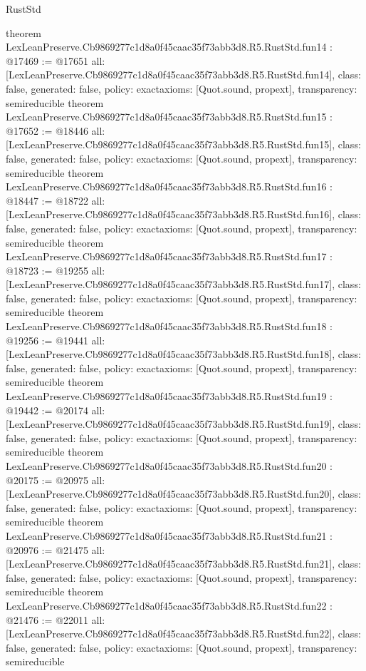 \begin{lexlean}{RustStd}
\begin{coremodule}
{}
theorem LexLeanPreserve.Cb9869277c1d8a0f45caac35f73abb3d8.R5.RustStd.fun14 : @17469 := @17651 {
  all: [LexLeanPreserve.Cb9869277c1d8a0f45caac35f73abb3d8.R5.RustStd.fun14],
  class: false,
  generated: false,
  policy: exact{axioms: [Quot.sound, propext]},
  transparency: semireducible
}
theorem LexLeanPreserve.Cb9869277c1d8a0f45caac35f73abb3d8.R5.RustStd.fun15 : @17652 := @18446 {
  all: [LexLeanPreserve.Cb9869277c1d8a0f45caac35f73abb3d8.R5.RustStd.fun15],
  class: false,
  generated: false,
  policy: exact{axioms: [Quot.sound, propext]},
  transparency: semireducible
}
theorem LexLeanPreserve.Cb9869277c1d8a0f45caac35f73abb3d8.R5.RustStd.fun16 : @18447 := @18722 {
  all: [LexLeanPreserve.Cb9869277c1d8a0f45caac35f73abb3d8.R5.RustStd.fun16],
  class: false,
  generated: false,
  policy: exact{axioms: [Quot.sound, propext]},
  transparency: semireducible
}
theorem LexLeanPreserve.Cb9869277c1d8a0f45caac35f73abb3d8.R5.RustStd.fun17 : @18723 := @19255 {
  all: [LexLeanPreserve.Cb9869277c1d8a0f45caac35f73abb3d8.R5.RustStd.fun17],
  class: false,
  generated: false,
  policy: exact{axioms: [Quot.sound, propext]},
  transparency: semireducible
}
theorem LexLeanPreserve.Cb9869277c1d8a0f45caac35f73abb3d8.R5.RustStd.fun18 : @19256 := @19441 {
  all: [LexLeanPreserve.Cb9869277c1d8a0f45caac35f73abb3d8.R5.RustStd.fun18],
  class: false,
  generated: false,
  policy: exact{axioms: [Quot.sound, propext]},
  transparency: semireducible
}
theorem LexLeanPreserve.Cb9869277c1d8a0f45caac35f73abb3d8.R5.RustStd.fun19 : @19442 := @20174 {
  all: [LexLeanPreserve.Cb9869277c1d8a0f45caac35f73abb3d8.R5.RustStd.fun19],
  class: false,
  generated: false,
  policy: exact{axioms: [Quot.sound, propext]},
  transparency: semireducible
}
theorem LexLeanPreserve.Cb9869277c1d8a0f45caac35f73abb3d8.R5.RustStd.fun20 : @20175 := @20975 {
  all: [LexLeanPreserve.Cb9869277c1d8a0f45caac35f73abb3d8.R5.RustStd.fun20],
  class: false,
  generated: false,
  policy: exact{axioms: [Quot.sound, propext]},
  transparency: semireducible
}
theorem LexLeanPreserve.Cb9869277c1d8a0f45caac35f73abb3d8.R5.RustStd.fun21 : @20976 := @21475 {
  all: [LexLeanPreserve.Cb9869277c1d8a0f45caac35f73abb3d8.R5.RustStd.fun21],
  class: false,
  generated: false,
  policy: exact{axioms: [Quot.sound, propext]},
  transparency: semireducible
}
theorem LexLeanPreserve.Cb9869277c1d8a0f45caac35f73abb3d8.R5.RustStd.fun22 : @21476 := @22011 {
  all: [LexLeanPreserve.Cb9869277c1d8a0f45caac35f73abb3d8.R5.RustStd.fun22],
  class: false,
  generated: false,
  policy: exact{axioms: [Quot.sound, propext]},
  transparency: semireducible
}
\end{coremodule}
\end{lexlean}
